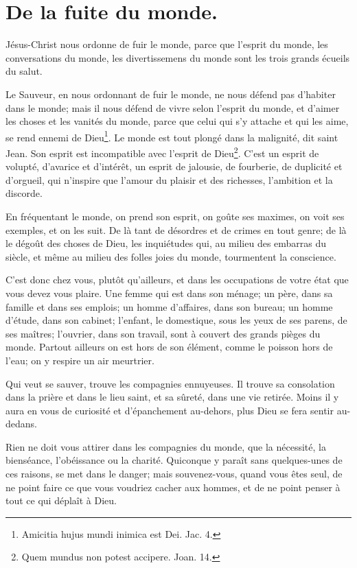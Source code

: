\documentclass[instructions.tex]{subfiles}
\begin{document}
 
\chapter{De la fuite du monde.}
 
Jésus-Christ nous ordonne de fuir le monde, parce que l'esprit du monde, les conversations du monde, les divertissemens du monde sont les trois grands écueils du salut.
 
\primo Le Sauveur, en nous ordonnant de fuir le monde, ne nous défend pas d'habiter dans le monde; mais il nous défend de vivre selon l'esprit du monde, et d'aimer les choses et les vanités du monde, parce que celui qui s'y attache et qui les aime, se rend ennemi de Dieu\footnote{Amicitia hujus mundi inimica est Dei. Jac. 4.}. Le monde est tout plongé dans la malignité, dit saint Jean. Son esprit est incompatible avec l'esprit de Dieu\footnote{Quem mundus non potest accipere. Joan. 14.}. C'est un esprit de volupté, d'avarice et d'intérêt, un esprit de jalousie, de fourberie, de duplicité et d'orgueil, qui n'inspire que l'amour du plaisir et des richesses, l'ambition et la discorde.
 
En fréquentant le monde, on prend son esprit, on goûte ses maximes, on voit ses exemples, et on les suit. De là tant de désordres et de crimes en tout genre; de là le dégoût des choses de Dieu, les inquiétudes qui, au milieu des embarras du siècle, et même au milieu des folles joies du monde, tourmentent la conscience.
 
C'est donc chez vous, plutôt qu'ailleurs, et dans les occupations de votre état que vous devez vous plaire. Une femme qui est dans son ménage; un père, dans sa famille et dans ses emplois; un homme d'affaires, dans son bureau; un homme d'étude, dans son cabinet; l'enfant, le domestique, sous les yeux de ses parens, de ses maîtres; l'ouvrier, dans son travail, sont à couvert des grands pièges du monde. Partout ailleurs on est hors de son élément, comme le poisson hors de l'eau; on y respire un air meurtrier.
 
Qui veut se sauver, trouve les compagnies ennuyeuses. Il trouve sa consolation dans la prière et dans le lieu saint, et sa sûreté, dans une vie retirée. Moins il y aura en vous de curiosité et d'épanchement au-dehors, plus Dieu se fera sentir au-dedans.
 
Rien ne doit vous attirer dans les compagnies du monde, que la nécessité, la bienséance, l'obéissance ou la charité. Quiconque y paraît sans quelques-unes de ces raisons, se met dans le danger; mais souvenez-vous, quand vous êtes seul, de ne point faire ce que vous voudriez cacher aux hommes, et de ne point penser à tout ce qui déplaît à Dieu.
 
\end{document}
